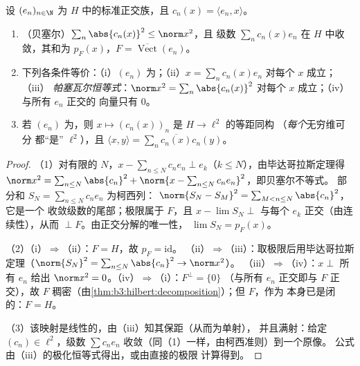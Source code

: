 \begin{theorem}\label{thm:b3:hilbert:parseval}
设 $(e_n)_{n\in\N}$ 为 $H$ 中的标准正交族，且 $c_n(x) =
\langle e_n, x\rangle$。
\begin{enumerate}
  \item （贝塞尔）$\sum_n\abs{c_n(x)}^2 \leq \norm x^2$，且
        级数 $\sum_nc_n(x)e_n$ 在 $H$ 中收敛，其和为
        $p_F(x)$，$F = \overline{\operatorname{Vect}}(e_n)$。
  \item 下列各条件等价：（i）$(e_n)$ 为；（ii）$x = \sum_nc_n(x)e_n$ 对每个 $x$ 成立；（iii）
        \emph{帕塞瓦尔恒等式}：$\norm x^2
        = \sum_n\abs{c_n(x)}^2$ 对每个 $x$ 成立；（iv）与所有 $e_n$ 正交的
        向量只有 $0$。
  \item 若 $(e_n)$ 为，则 $x \mapsto (c_n(x))_n$
        是 $H \to \ell^2$ 的等距同构
        （\emph{每个}无穷维可分
        都“是” $\ell^2$），且 $\langle x, y\rangle =
        \sum_n\overline{c_n(x)}c_n(y)$。
\end{enumerate}
\end{theorem}

\begin{proof}
（1）对有限的 $N$，$x - \sum_{n\leq N}c_ne_n \perp e_k$（$k
\leq N$），由毕达哥拉斯定理得 $\norm x^2 = \sum_{n\leq
N}\abs{c_n}^2 + \norm{x - \sum_{n\leq N}c_ne_n}^2$，即贝塞尔不等式。
部分和 $S_N = \sum_{n\leq N}c_ne_n$ 为柯西列：
$\norm{S_N - S_M}^2 = \sum_{M<n\leq N}\abs{c_n}^2$，它是一个
收敛级数的尾部；极限属于 $F$，且 $x - \lim S_N
\perp$ 与每个 $e_k$ 正交（由连续性），从而 $\perp F$。由正交分解的唯一性，
$\lim S_N = p_F(x)$。

（2）（i）$\Rightarrow$（ii）：$F = H$，故 $p_F = \mathrm{id}$。
（ii）$\Rightarrow$（iii）：取极限后用毕达哥拉斯定理（$\norm{S_N}^2
= \sum_{n \leq N}\abs{c_n}^2 \to \norm x^2$）。
（iii）$\Rightarrow$（iv）：$x \perp$ 所有 $e_n$ 给出 $\norm x^2 =
0$。（iv）$\Rightarrow$（i）：$F^\perp = \{0\}$
（与所有 $e_n$ 正交即与 $F$ 正交），故 $F$
稠密（由\cref{thm:b3:hilbert:decomposition}）；但 $F$，作为
本身已是闭的：$F = H$。

（3）该映射是线性的，由（iii）知其保距（从而为单射），
并且满射：给定 $(c_n) \in \ell^2$，级数 $\sum
c_ne_n$ 收敛（同（1）一样，由柯西准则）到一个原像。
公式由（iii）的极化恒等式得出，或由直接的极限
计算得到。
\end{proof}

